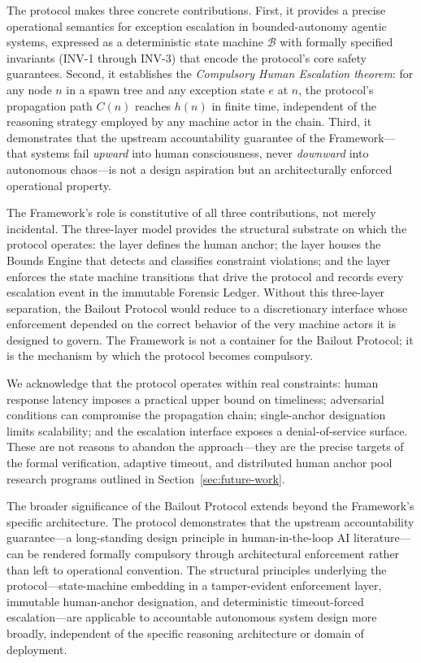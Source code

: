 The protocol makes three concrete contributions. First, it provides a precise operational semantics for exception escalation in bounded-autonomy agentic systems, expressed as a deterministic state machine $\mathcal{B}$ with formally specified invariants (INV-1 through INV-3) that encode the protocol's core safety guarantees. Second, it establishes the \textit{Compulsory Human Escalation theorem}: for any node $n$ in a \bxthree{} spawn tree and any exception state $e$ at $n$, the protocol's propagation path $C(n)$ reaches $h(n)$ in finite time, independent of the reasoning strategy employed by any machine actor in the chain. Third, it demonstrates that the upstream accountability guarantee of the \bxthree{} Framework---that systems fail \emph{upward} into human consciousness, never \emph{downward} into autonomous chaos---is not a design aspiration but an architecturally enforced operational property.

The \bxthree{} Framework's role is constitutive of all three contributions, not merely incidental. The three-layer model provides the structural substrate on which the protocol operates: the \purpose{} layer defines the human anchor; the \bounds{} layer houses the Bounds Engine that detects and classifies constraint violations; and the \fact{} layer enforces the state machine transitions that drive the protocol and records every escalation event in the immutable Forensic Ledger. Without this three-layer separation, the Bailout Protocol would reduce to a discretionary interface whose enforcement depended on the correct behavior of the very machine actors it is designed to govern. The \bxthree{} Framework is not a container for the Bailout Protocol; it is the mechanism by which the protocol becomes compulsory.

We acknowledge that the protocol operates within real constraints: human response latency imposes a practical upper bound on timeliness; adversarial conditions can compromise the propagation chain; single-anchor designation limits scalability; and the escalation interface exposes a denial-of-service surface. These are not reasons to abandon the approach---they are the precise targets of the formal verification, adaptive timeout, and distributed human anchor pool research programs outlined in Section~\ref{sec:future-work}.

The broader significance of the Bailout Protocol extends beyond the \bxthree{} Framework's specific architecture. The protocol demonstrates that the upstream accountability guarantee---a long-standing design principle in human-in-the-loop AI literature---can be rendered formally compulsory through architectural enforcement rather than left to operational convention. The structural principles underlying the protocol---state-machine embedding in a tamper-evident enforcement layer, immutable human-anchor designation, and deterministic timeout-forced escalation---are applicable to accountable autonomous system design more broadly, independent of the specific reasoning architecture or domain of deployment.
